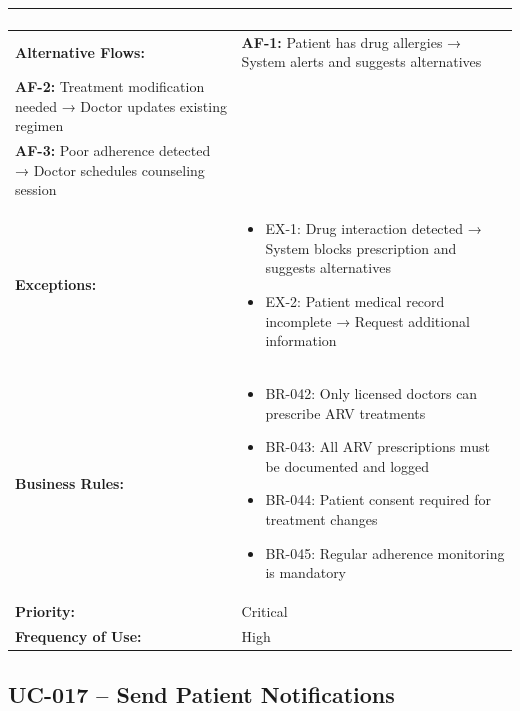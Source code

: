 \documentclass[12pt,a4paper]{article}
\begin{document}
\begin{longtable}{|p{4.5cm}|p{10.5cm}|}
\begin{enumerate}
\end{enumerate} \\
\hline
\textbf{Alternative Flows:} &
\textbf{AF-1:} Patient has drug allergies → System alerts and suggests alternatives \\
\textbf{AF-2:} Treatment modification needed → Doctor updates existing regimen \\
\textbf{AF-3:} Poor adherence detected → Doctor schedules counseling session \\
\hline
\textbf{Exceptions:} &
\begin{itemize}
  \item EX-1: Drug interaction detected → System blocks prescription and suggests alternatives
  \item EX-2: Patient medical record incomplete → Request additional information
\end{itemize} \\
\hline
\textbf{Business Rules:} &
\begin{itemize}
  \item BR-042: Only licensed doctors can prescribe ARV treatments
  \item BR-043: All ARV prescriptions must be documented and logged
  \item BR-044: Patient consent required for treatment changes
  \item BR-045: Regular adherence monitoring is mandatory
\end{itemize} \\
\hline
\textbf{Priority:} & Critical \\
\hline
\textbf{Frequency of Use:} & High \\
\hline
\end{longtable}

\subsection{UC-017 – Send Patient Notifications}
\end{document}
